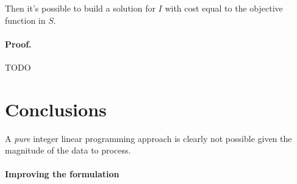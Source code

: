 Then it's possible to build a solution for $I$ with cost equal to the objective function in $S$.

\paragraph{Proof.}
TODO


\section{Conclusions}

A \textit{pure} integer linear programming approach is clearly not possible given the magnitude of the data to process.

\paragraph{Improving the formulation}